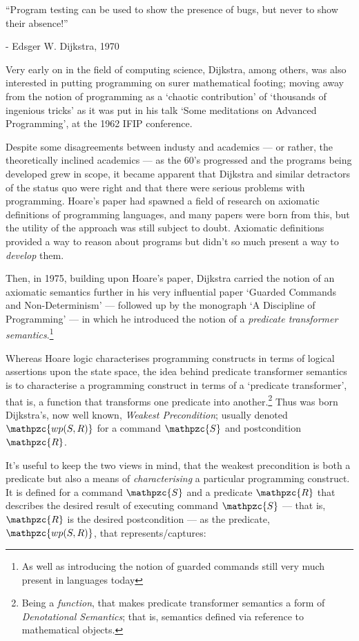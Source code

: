 \documentclass[oneside,12pt]{article}
\newcommand{\textM}[1]{\ensuremath{\mathpzc{#1}}}
\begin{document}
\epigraph{``Program testing can be used to show the presence of bugs, but never to show their absence!''}{ \scriptsize - Edsger W. Dijkstra, 1970 }

Very early on in the field of computing science, Dijkstra, among others, was also interested in putting programming on surer mathematical footing; moving away from the notion of programming as a `chaotic contribution' of `thousands of ingenious tricks' as it was put in his talk `Some meditations on Advanced Programming'\cite{Dijkstra62}, at the 1962 IFIP conference.

Despite some disagreements between industy and academics --- or rather, the theoretically inclined academics --- as the 60's progressed and the programs being developed grew in scope, it became apparent that Dijkstra and similar detractors of the status quo were right and that there were serious problems with programming. Hoare's paper had spawned a field of research on axiomatic definitions of programming languages, and many papers were born from this, but the utility of the approach was still subject to doubt. Axiomatic definitions provided a way to reason about programs but didn't so much present a way to \emph{develop} them.

Then, in 1975, building upon Hoare's paper, Dijkstra carried the notion of an axiomatic semantics further in his very influential paper `Guarded Commands and Non-Determinism'\cite{Dijkstra75} --- followed up by the monograph `A Discipline of Programming'\cite{Dijkstra76} --- in which he introduced the notion of a \emph{predicate transformer semantics}.\footnote{As well as introducing the notion of guarded commands still very much present in languages today}



Whereas Hoare logic characterises programming constructs in terms of logical assertions upon the state space, the idea behind predicate transformer semantics is to characterise a programming construct in terms of a `predicate transformer', that is, a function that transforms one predicate into another.\footnote{Being a \emph{function}, that makes predicate transformer semantics a form of \emph{Denotational Semantics}; that is, semantics defined via reference to mathematical objects.} Thus was born Dijkstra's, now well known, \emph{Weakest Precondition}; usually denoted \textM{wp(S,R)} for a command \textM{S} and postcondition \textM{R}.


It's useful to keep the two views in mind, that the weakest precondition is both a predicate but also a means of \emph{characterising} a particular programming construct. It is defined for a command \textM{S} and a predicate \textM{R} that describes the desired result of executing command \textM{S} --- that is, \textM{R} is the desired postcondition --- as the predicate, \textM{wp(S,R)}, that represents/captures:
\end{document}
